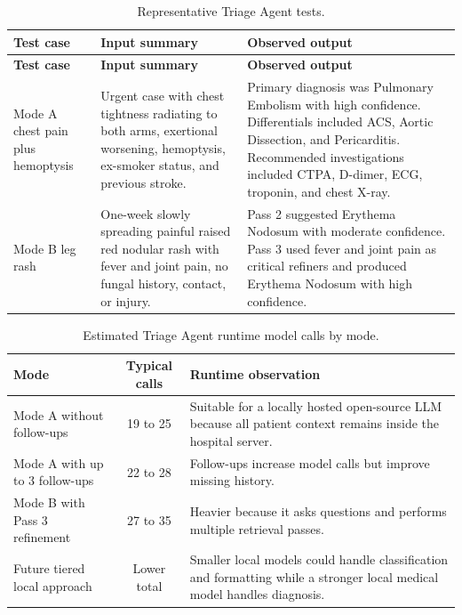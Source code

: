 \begin{longtable}{p{} p{} p{}}
\caption{Representative Triage Agent tests.}
\label{tab:triage_tests}\\
\toprule
\textbf{Test case} & \textbf{Input summary} & \textbf{Observed output}\\
\midrule
\endfirsthead
\toprule
\textbf{Test case} & \textbf{Input summary} & \textbf{Observed output}\\
\midrule
\endhead
Mode A chest pain plus hemoptysis & Urgent case with chest tightness radiating to both arms, exertional worsening, hemoptysis, ex-smoker status, and previous stroke. & Primary diagnosis was Pulmonary Embolism with high confidence. Differentials included ACS, Aortic Dissection, and Pericarditis. Recommended investigations included CTPA, D-dimer, ECG, troponin, and chest X-ray.\\
Mode B leg rash & One-week slowly spreading painful raised red nodular rash with fever and joint pain, no fungal history, contact, or injury. & Pass 2 suggested Erythema Nodosum with moderate confidence. Pass 3 used fever and joint pain as critical refiners and produced Erythema Nodosum with high confidence.\\
\bottomrule
\end{longtable}

\begin{table}[htbp]
\centering
\caption{Estimated Triage Agent runtime model calls by mode.}
\label{tab:triage_cost}
\begin{tabular}{p{} c p{}}
\toprule
\textbf{Mode} & \textbf{Typical calls} & \textbf{Runtime observation}\\
\midrule
Mode A without follow-ups & 19 to 25 & Suitable for a locally hosted open-source LLM because all patient context remains inside the hospital server.\\
Mode A with up to 3 follow-ups & 22 to 28 & Follow-ups increase model calls but improve missing history.\\
Mode B with Pass 3 refinement & 27 to 35 & Heavier because it asks questions and performs multiple retrieval passes.\\
Future tiered local approach & Lower total & Smaller local models could handle classification and formatting while a stronger local medical model handles diagnosis.\\
\bottomrule
\end{tabular}
\end{table}

